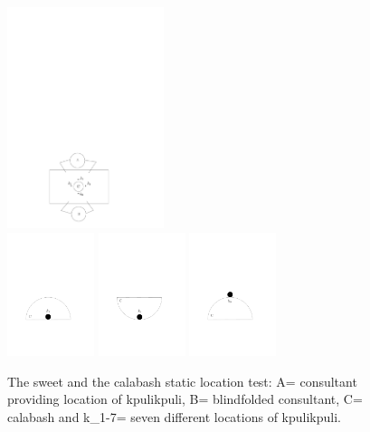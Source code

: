 \begin{figure}[h!]
 \centering
\includegraphics[width=1.8in]{Graphic/Pictures/Settings.pdf}\\
 \includegraphics[width=1in]{Graphic/Pictures/K1.pdf}
\includegraphics[width=1in]{Graphic/Pictures/K2.pdf}
\includegraphics[width=1in]{Graphic/Pictures/K3.pdf}

 \caption[Static location test: The sweet and the calabash]{The sweet and the
calabash static location test: A= consultant providing location of kpulikpuli,
B= blindfolded consultant,  C= calabash and k_{1-7}= seven
different locations of kpulikpuli.}
 \label{fig:Space-test}
\end{figure}



